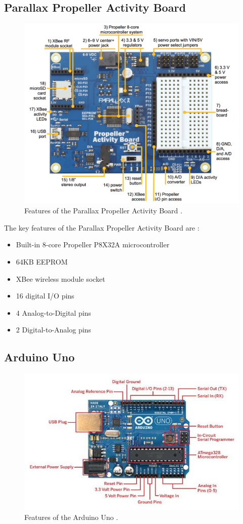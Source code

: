 \documentclass{UoYCSproject}
\begin{document}
\subsection{Parallax Propeller Activity Board}
\begin{figure}[h!]
  \centering
  \includegraphics[width=0.6\linewidth]{graphics/propeller_board.png}
  \caption{Features of the Parallax Propeller Activity Board \parencite{propellerspec}.}
  \label{fig:prop_board}
\end{figure}

The key features of the Parallax Propeller Activity Board are \parencite{propellerspec}:
\begin{itemize}
\item Built-in 8-core Propeller P8X32A microcontroller
\item 64KB EEPROM
\item XBee wireless module socket
\item 16 digital I/O pins
\item 4 Analog-to-Digital pins
\item 2 Digital-to-Analog pins
\end{itemize}

\subsection{Arduino Uno}
\begin{figure}[h!]
  \centering
  \includegraphics[width=0.8\linewidth]{graphics/arduino_board.jpg}
  \caption{Features of the Arduino Uno \parencite{arduinodiagram}.}
  \label{fig:arduino_uno}
\end{figure}
\end{document}
